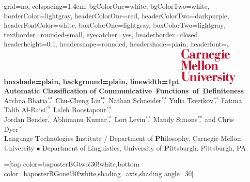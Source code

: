\documentclass[portrait,final]{baposter}
\begin{document}
\begin{poster}{
  grid=no,
  colspacing=1.4em,
  bgColorOne=white, %
  bgColorTwo=white, %
  borderColor=lightgray, %
  headerColorOne=red, %
  headerColorTwo=darkpurple, %
  headerFontColor=white,
  boxColorOne=lightgray, %
  boxColorTwo=lightgray, %
  textborder=rounded-small, %
  eyecatcher=yes,
  headerborder=closed,
  headerheight=0.1\textheight,
  headershape=rounded, %
  headershade=plain,
  headerfont=\large\bf\sc\textsf, %
  boxshade=plain,
  background=plain,
  linewidth=1pt
}
  {%
\includegraphics[width=8em]{img/cmu_logo}\\
} %
  {\bf %
  \textbf{Automatic Classification of Communicative~Functions~of~Definiteness}
  }
  {\large %
  Archna Bhatia$\overset{^\textsc{lti}}{\textrm{,}}$ Chu-Cheng Lin$\overset{^\textsc{lti}}{\textrm{,}}$ Nathan Schneider$\overset{^\textsc{lti}}{\textrm{,}}$ Yulia Tsvetkov$\overset{^\textsc{lti}}{\textrm{,}}$ Fatima Talib Al-Raisi$\overset{^\textsc{lti}}{\textrm{,}}$ Laleh Roostapour$\overset{^\textsc{lti}}{\textrm{,}}$ \\ Jordan Bender$\overset{^\textsc{p}}{\textrm{,}}$ Abhimanu Kumar$\overset{^\textsc{lti}}{\textrm{,}}$ Lori Levin$\overset{^\textsc{lti}}{\textrm{,}}$ Mandy Simons$\overset{^\textsc{ph}}{\textrm{,}}$ and Chris Dyer$\overset{^\textsc{lti}}{\textrm{}}$
  \\
  \textbf{L}anguage \textbf{T}echnologies \textbf{I}nstitute / Department of \textbf{Ph}ilosophy, Carnegie Mellon University $\bullet$ Department of Linguistics, University of \textbf{P}ittsburgh. Pittsburgh, PA
  }

  =[top color=baposterBGtwo!30!white,bottom color=baposterBGone!30!white,shading=axis,shading angle=30]


\end{poster}
\end{document}
